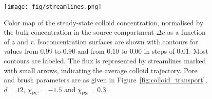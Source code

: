 \documentclass[12pt, a4paper]{article}
\newcommand\todo[1]{\textcolor{red}{#1}}
\begin{document}
\begin{figure}
    \centering
    \texttt{[image: fig/streamlines.png]}
    \caption{
    Color map of the steady-state colloid concentration, normalised by the bulk concentration in the source compartment $\Delta c$ as a function of $z$ and $r$.
    Isoconcentration surfaces are shown with contours for values from 0.99 to 0.90 and from 0.10 to 0.00 in steps of 0.01.
    Most contours are labeled.
    The flux is represented by streamlines marked with small arrows, indicating the average colloid trajectory.
    Pore and brush parameters are as given in Figure~\ref{fig:colloid_transport}, $d = 12$, $\chi_{\text{PC}} = -1.5$ and $\chi_{\text{PS}} = 0.3$.
    }
    \label{fig:colloid_concentration}
\end{figure}


\end{document}
